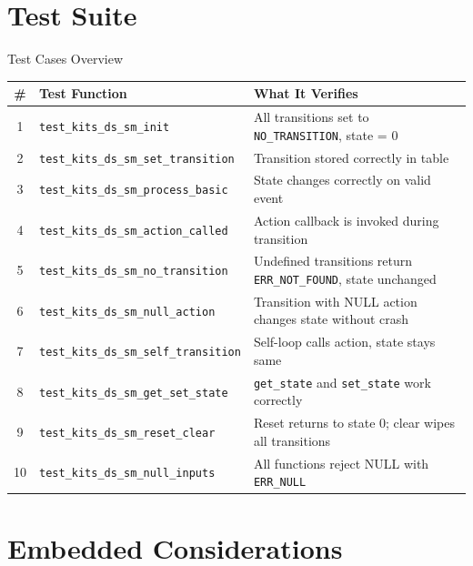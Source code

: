 \documentclass[aspectratio=169, 10pt]{beamer}
\begin{document}
\section{Test Suite}

\begin{frame}{Test Cases Overview}
\begin{table}
\centering
\small
\begin{tabular}{@{}clp{7cm}@{}}
\toprule
\textbf{\#} & \textbf{Test Function} & \textbf{What It Verifies} \\
\midrule
1 & \texttt{test\_kits\_ds\_sm\_init}
  & All transitions set to \texttt{NO\_TRANSITION}, state = 0 \\
2 & \texttt{test\_kits\_ds\_sm\_set\_transition}
  & Transition stored correctly in table \\
3 & \texttt{test\_kits\_ds\_sm\_process\_basic}
  & State changes correctly on valid event \\
4 & \texttt{test\_kits\_ds\_sm\_action\_called}
  & Action callback is invoked during transition \\
5 & \texttt{test\_kits\_ds\_sm\_no\_transition}
  & Undefined transitions return \texttt{ERR\_NOT\_FOUND}, state unchanged \\
6 & \texttt{test\_kits\_ds\_sm\_null\_action}
  & Transition with NULL action changes state without crash \\
7 & \texttt{test\_kits\_ds\_sm\_self\_transition}
  & Self-loop calls action, state stays same \\
8 & \texttt{test\_kits\_ds\_sm\_get\_set\_state}
  & \texttt{get\_state} and \texttt{set\_state} work correctly \\
9 & \texttt{test\_kits\_ds\_sm\_reset\_clear}
  & Reset returns to state 0; clear wipes all transitions \\
10 & \texttt{test\_kits\_ds\_sm\_null\_inputs}
  & All functions reject NULL with \texttt{ERR\_NULL} \\
\bottomrule
\end{tabular}
\end{table}
\end{frame}

\section{Embedded Considerations}
\end{document}
